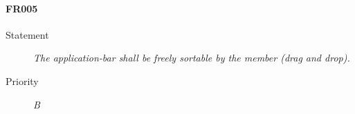 \paragraph{FR005}
  \begin{description}
  \item [Statement] 
    \textit{ The application-bar shall be freely sortable by the member (drag and drop).}
  \item [Priority] \textit{B}
\end{description}